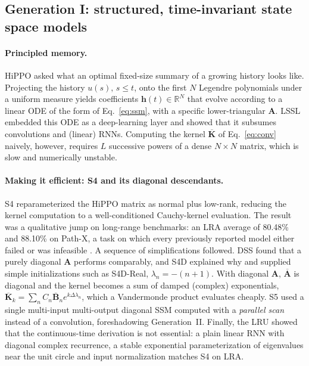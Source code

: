 \documentclass[a4paper]{article}
\newcommand{\R}{\mathbb{R}}
\newcommand{\vh}{\mathbf{h}}
\newcommand{\mA}{\mathbf{A}}
\newcommand{\Ab}{\overline{\mathbf{A}}}
\newcommand{\Bb}{\overline{\mathbf{B}}}
\newcommand{\Kb}{\overline{\mathbf{K}}}
\theoremstyle{plain}
\theoremstyle{remark}
\begin{document}
\subsection{Generation I: structured, time-invariant state space models}
\label{sec:gen1}
\paragraph{Principled memory.} HiPPO \citep{gu2020hippo} asked what an optimal fixed-size summary of a growing history looks like. Projecting the history $u(s),\,s\le t$, onto the first $N$ Legendre polynomials under a uniform measure yields coefficients $\vh(t)\in\R^N$ that evolve according to a linear ODE of the form of Eq.~\eqref{eq:ssm}, with a specific lower-triangular $\mA$. LSSL \citep{gu2021lssl} embedded this ODE as a deep-learning layer and showed that it subsumes convolutions and (linear) RNNs. Computing the kernel $\Kb$ of Eq.~\eqref{eq:conv} naively, however, requires $L$ successive powers of a dense $N\times N$ matrix, which is slow and numerically unstable.

\paragraph{Making it efficient: S4 and its diagonal descendants.} S4 \citep{gu2022s4} reparameterized the HiPPO matrix as normal plus low-rank, reducing the kernel computation to a well-conditioned Cauchy-kernel evaluation. The result was a qualitative jump on long-range benchmarks: an LRA average of 80.48\% and 88.10\% on Path-X, a task on which every previously reported model either failed or was infeasible \citep{tay2021lra}. A sequence of simplifications followed. DSS \citep{gupta2022dss} found that a purely diagonal $\mA$ performs comparably, and S4D \citep{gu2022s4d} explained why and supplied simple initializations such as S4D-Real, $\lambda_n=-(n+1)$. With diagonal $\mA$, $\Ab$ is diagonal and the kernel becomes a sum of damped (complex) exponentials, $\Kb_k=\sum_{n}C_n\Bb_n e^{k\Delta\lambda_n}$, which a Vandermonde product evaluates cheaply. S5 \citep{smith2023s5} used a single multi-input multi-output diagonal SSM computed with a \emph{parallel scan} instead of a convolution, foreshadowing Generation~II. Finally, the LRU \citep{orvieto2023lru} showed that the continuous-time derivation is not essential: a plain linear RNN with diagonal complex recurrence, a stable exponential parameterization of eigenvalues near the unit circle and input normalization matches S4 on LRA.
\end{document}
